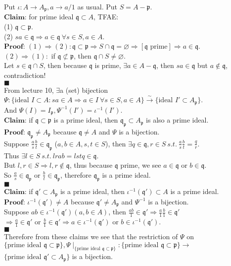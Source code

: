 \documentclass{article}
\newcommand{\inv}{^{-1}}
\newcommand{\ST}{\ s.t.\ }
\newcommand{\Proof}{$\textbf{Proof: }$}
\newcommand{\Claim}{$\textbf{Claim: }$}
\newcommand{\pp}{\mathfrak{p}}
\newcommand{\qq}{\mathfrak{q}}
\newcommand{\fa}{\ \forall}
\newcommand{\br}[1]{\{ #1 \}}
\newcommand{\rst}[2]{#1\!\mid_{#2}}
\begin{document}
Put $\iota:A\rightarrow A_{\pp},a\rightarrow a/1$ as usual. Put $S=A-\pp$.\\
\Claim for prime ideal $\qq\subset A$, TFAE:\\
(1) $\qq\subset \pp$.\\
(2) $sa\in \qq\Rightarrow a\in\qq\fa s\in S,a\in A$.\\
\Proof $(1)\Rightarrow (2): \qq\subset \pp\Rightarrow S\cap \qq=\varnothing\Rightarrow [\qq\text{ prime}]\Rightarrow a\in\qq$.\\
$(2)\Rightarrow (1):$ if $\qq\not\subset \pp$, then $\qq\cap S\ne \varnothing$.\\
Let $s\in \qq\cap S$, then because $\qq$ is prime, $\exists a\in A-\qq$, then $sa\in \qq$ but $a\not\in \qq$, contradiction!\\
$\blacksquare$\\
From lecture 10, $\exists$a (set) bijection\\
$\Psi:\br{\text{ideal }I\subset A:sa\in A\Rightarrow a\in I\fa s\in S,a\in A}\xrightarrow{\sim} \br{\text{ideal }I'\subset A_\pp}$.\\
And $\Psi(I)=I_\pp,\Psi\inv(I')=\iota\inv(I')$.\\
\Claim if $\qq\subset \pp$ is a prime ideal, then $\qq_\pp\subset A_\pp$ is also a prime ideal.\\
\Proof $\qq_\pp\ne A_\pp$ because $\qq\ne A$ and $\Psi$ is a bijection.\\
Suppose $\frac{a}{s}\frac{b}{t}\in\qq_\pp$ ($a,b\in A,s,t\in S$), then $\exists q\in \qq,r\in S\ST \frac{a}{s}\frac{b}{t}=\frac{q}{r}$.\\
Thus $\exists l\in S\ST lrab=lstq\in \qq$.\\
But $l,r\in S\Rightarrow l,r\not\in \qq$, thus because $\qq$ prime, we see $a\in \qq$ or $b\in\qq$.\\
So $\frac{a}{s}\in \qq_\pp$ or $\frac{b}{t}\in \qq_\pp$, therefore $\qq_\pp$ is a prime ideal.\\
$\blacksquare$\\
\Claim if $\qq'\subset A_\pp$ is a prime ideal, then $\iota\inv(\qq')\subset A$ is a prime ideal.\\
\Proof $\iota\inv(\qq')\ne A$ because $\qq'\ne A_\pp$ and $\Psi\inv$ is a bijection.\\
Suppose $ab\in \iota\inv(\qq')(a,b\in A)$, then $\frac{ab}{1}\in \qq'\Rightarrow \frac{a}{1}\frac{b}{1}\in \qq'$\\
$\Rightarrow \frac{a}{1}\in \qq'$ or $\frac{b}{1}\in \qq'\Rightarrow a\in \iota\inv(\qq')$ or $b\in \iota\inv(\qq')$.\\
$\blacksquare$\\
Therefore from these claims we see that the restriction of $\Psi$ on\\
$\br{\text{prime ideal }\qq\subset\pp},\rst{\Psi}{\br{\text{prime ideal }\qq\subset \pp}}:\br{\text{prime ideal }\qq\subset \pp}\rightarrow$\\
$\br{\text{prime ideal }\qq'\subset A_\pp}$ is a bijection.
\end{document}
